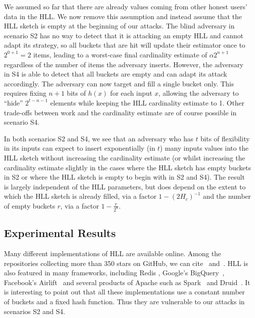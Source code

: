 \documentclass[11pt]{article}
\begin{document}
We assumed so far that there are already values coming from other honest users' data in the HLL. We now remove this assumption and instead assume that the HLL sketch is empty at the beginning of our attacks. The blind adversary in scenario S2 has no way to detect that it is attacking an empty HLL and cannot adapt its strategy, so all buckets that are hit will update their estimator once to $2^{0+1}=2$ items, leading to a worst-case final cardinality estimate of $\alpha2^{n+1}$ regardless of the number of items the adversary inserts. However, the adversary in S4 is able to detect that all buckets are empty and can adapt its attack accordingly. The adversary can now target and fill a single bucket only. This requires fixing $n+1$ bits of $h(x)$ for each input $x$, allowing the adversary to ``hide'' $2^{t-n-1}$ elements while keeping the HLL cardinality estimate to 1. Other trade-offs between work and the cardinality estimate are of course possible in scenario S4.

In both scenarios S2 and S4, we see that an adversary who has $t$ bits of flexibility in its inputs can expect to insert exponentially (in $t$) many inputs values into the HLL sketch without increasing the cardinality estimate (or whilst increasing the cardinality estimate slightly in the cases where the HLL sketch has empty buckets in S2 or where the HLL sketch is empty to begin with in S2 and S4). The result is largely independent of the HLL parameters, but does depend on the extent to which the HLL sketch is already filled, via a factor $1-(2H_c)^{-1}$ and the number of empty buckets $r$, via a factor $1- \frac{r}{2^n}$.


\subsection{Experimental Results}
Many different implementations of HLL are available online. Among the repositories collecting more than 350 stars on GitHub, we can cite~\cite{clahll} and~\cite{datasketch}. HLL is also featured in many frameworks, including Redis \cite{redis}, Google's BigQuery~\cite{bigquery}, Facebook's Airlift~\cite{airlift} and several products of Apache such as Spark~\cite{spahll} and Druid~\cite{druhll}. It is interesting to point out that all these implementations use a constant number of buckets and a fixed hash function. Thus they are vulnerable to our attacks in scenarios S2 and S4.
\end{document}
